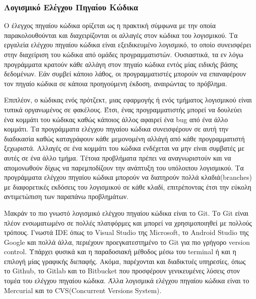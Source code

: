 \documentclass[a4paper, 11pt]{article}
\begin{document}
{{\subsubsection{Λογισμικό Ελέγχου Πηγαίου Κώδικα}

Ο έλεγχος πηγαίου κώδικα ορίζεται ως η πρακτική σύμφωνα με την οποία παρακολουθούνται και διαχειρίζονται οι αλλαγές στον κώδικα του λογισμικού. Τα εργαλεία ελέγχου πηγαίου κώδικα είναι εξειδικευμένο λογισμικό, το οποίο συνεισφέρει στην διαχείριση του κώδικα από ομάδες προγραμματιστών. Ουσιαστικά, τα εν λόγω προγράμματα κρατούν κάθε αλλάγη στον πηγαίο κώδικα εντός μίας ειδικής βάσης δεδομένων. Εάν συμβεί κάποιο λάθος, οι προγραμματιστές μπορούν να επαναφέρουν τον πηγαίο κώδικα σε κάποια προηγούμενη έκδοση, αναιρώντας το πρόβλημα.

Επιπλέον, ο κώδικας ενός πρότζεκτ, μιας εφαρμογής ή ενός τμήματος λογισμικού είναι τυπικά οργανωμένος σε φακέλους. Έτσι, ένας προγραμματιστής μπορεί να δουλεύει ένα κομμάτι του κώδικας καθώς κάποιος άλλος αφαιρεί ένα \textlatin{bug} από ένα άλλο κομμάτι. Τα προγράμματα ελέγχου πηγαίου κώδικα συνεισφέρουν σε αυτή την διαδικασία καθώς καταγράφουν κάθε μεμονομένη αλλάγή από κάθε προγραμματιστή ξεχωριστά. Αλλαγές σε ένα κομμάτι του κώδικα ενδέχεται να μην είναι συμβατές με αυτές σε ένα άλλο τμήμα. Τέτοια προβλήματα πρέπει να αναγνωριστούν και να απομονωθούν δίχως να παρεμποδίζουν την ανάπτυξη του υπόλοιπου λογισμικού. Τα προγράμματα ελέγχου πηγαίου κώδικα μπορούν να διατηρούν πολλά κλαδιά(\textlatin{branches}) με διαφορετικές εκδόσεις του λογισμικού σε κάθε κλαδί, επιτρέποντας έτσι την εύκολη αντιμετώπιση των παραπάνω προβλημάτων.

Μακράν το πιο γνωστό λογισμικό ελέγχου πηγαίου κώδικα είναι το \textlatin{Git}. Το \textlatin{Git} είναι πλέον ενσωματωμένο σε πολλές πλατφόρμες και μπορεί να χρησιμοποιηθεί με πολλούς τρόπους. Γνωστά \textlatin{IDE} όπως το \textlatin{Visual Studio} της \textlatin{Microsoft}, το \textlatin{Android Studio} της \textlatin{Google} και πολλά άλλα, περιέχουν προεγκατεστημένο το \textlatin{Git} για πιο γρήγορο \textlatin{version control}. Υπάρχει φυσικά και η παραδοσιακή μέθοδος μέσω του \textlatin{terminal} ή και η επιλογή μίας γραφικής διεπαφής. Ακόμα, παρέχονται και διαδικτυές υπηρεσίες, όπως το \textlatin{Github}, το \textlatin{Gitlab} και το \textlatin{Bitbucket} που προσφέρουν γενικευμένες λύσεις στον τομέα του ελέγχου πηγαίου κώδικα. Άλλα λογισμικά ελέγχου πηγαίου κώδικα είναι το \textlatin{Mercurial} και το \textlatin{CVS(Concurrent Versions System)}.

}}
\end{document}
